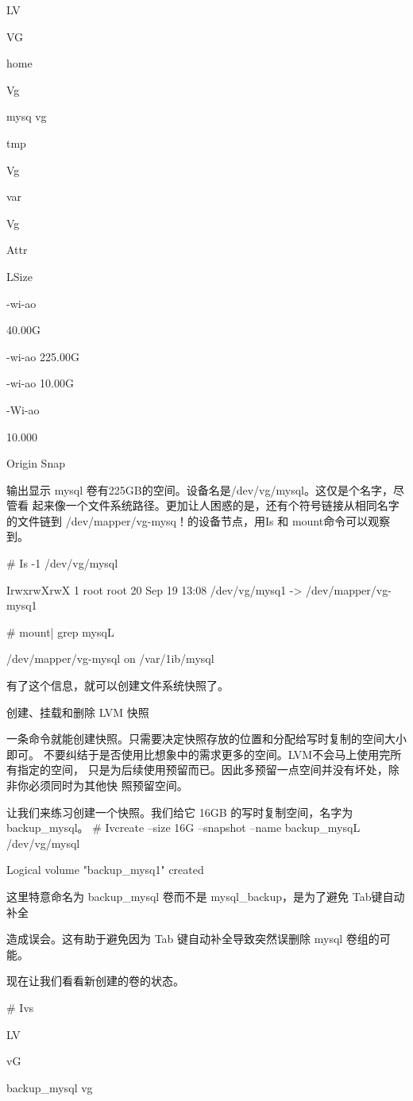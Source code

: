 LV

VG

home

Vg

mysq vg

tmp

Vg

var

Vg

Attr

LSize

-wi-ao

40.00G

-wi-ao 225.00G

-wi-ao 10.00G

-Wi-ao

10.000

Origin Snap%

输出显示 mysql 卷有225GB的空间。设备名是/dev/vg/mysql。这仅是个名字，尽管看
起来像一个文件系统路径。更加让人困惑的是，还有个符号链接从相同名字的文件链到
/dev/mapper/vg-mysq！的设备节点，用Is 和 mount命令可以观察到。

# Is -1 /dev/vg/mysql

IrwxrwXrwX 1 root root 20 Sep 19 13:08 /dev/vg/mysq1 -> /dev/mapper/vg-mysq1

# mount| grep mysqL

/dev/mapper/vg-mysql on /var/1ib/mysql

有了这个信息，就可以创建文件系统快照了。

创建、挂载和删除 LVM 快照

一条命令就能创建快照。只需要决定快照存放的位置和分配给写时复制的空间大小即可。
不要纠结于是否使用比想象中的需求更多的空间。LVM不会马上使用完所有指定的空间，
只是为后续使用预留而已。因此多预留一点空间并没有坏处，除非你必须同时为其他快
照预留空间。

让我们来练习创建一个快照。我们给它 16GB 的写时复制空间，名字为 backup\_mysql。
# Ivcreate --size 16G --snapshot --name backup\_mysqL /dev/vg/mysql

Logical volume "backup\_mysq1" created

这里特意命名为 backup\_mysql 卷而不是 mysql\_backup，是为了避免 Tab键自动补全

造成误会。这有助于避免因为 Tab 键自动补全导致突然误删除 mysql 卷组的可能。

现在让我们看看新创建的卷的状态。

# Ivs

LV

vG

backup\_mysql vg

